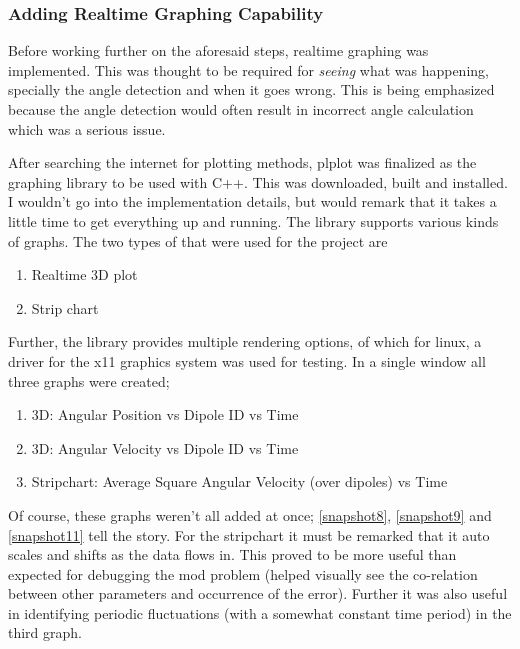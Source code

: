 		\subsubsection{Adding Realtime Graphing Capability}
			Before working further on the aforesaid steps, realtime graphing was implemented. This was thought to be required for \emph{seeing} what was happening, specially the angle detection and when it goes wrong. This is being emphasized because the angle detection would often result in incorrect angle calculation which was a serious issue.
			\par
			After searching the internet for plotting methods, plplot was finalized as the graphing library to be used with C++. This was downloaded, built and installed. I wouldn't go into the implementation details, but would remark that it takes a little time to get everything up and running. The library supports various kinds of graphs. The two types of that were used for the project are
			\begin{enumerate}
				\item Realtime 3D plot
				\item Strip chart
			\end{enumerate}
			Further, the library provides multiple rendering options, of which for linux, a driver for the x11 graphics system was used for testing. In a single window all three graphs were created;
			\begin{enumerate}
				\item 3D: Angular Position vs Dipole ID vs Time
				\item 3D: Angular Velocity vs Dipole ID vs Time
				\item Stripchart: Average Square Angular Velocity (over dipoles) vs Time
			\end{enumerate}
			Of course, these graphs weren't all added at once; \autoref{snapshot8}, \autoref{snapshot9} and \autoref{snapshot11} tell the story. For the stripchart it must be remarked that it auto scales and shifts as the data flows in. This proved to be more useful than expected for debugging the mod problem (helped visually see the co-relation between other parameters and occurrence of the error). Further it was also useful in identifying periodic fluctuations (with a somewhat constant time period) in the third graph.
